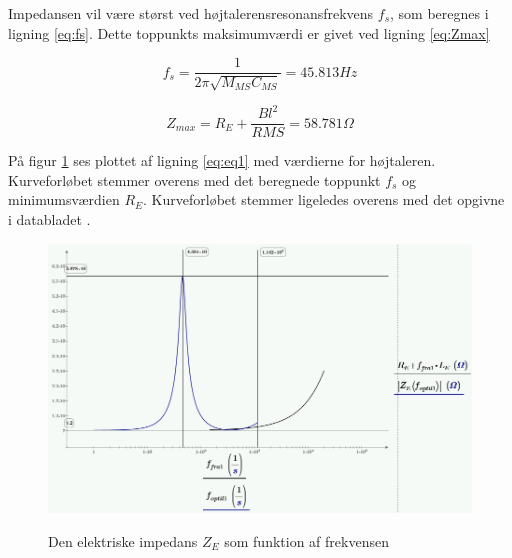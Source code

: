 Impedansen vil være størst ved højtalerensresonansfrekvens $f_s$, som beregnes i ligning \ref{eq:fs}. Dette toppunkts maksimumværdi er givet ved ligning \ref{eq:Zmax} 

\begin{equation}\label{eq:fs}
	f_s=\frac{1}{2 \pi \sqrt{M_{MS} C_{MS}}}=45.813Hz
\end{equation}

\begin{equation}\label{eq:Zmax}
	Z_{max}=R_E+\frac{Bl^2}{R{MS}}=58.781\Omega
\end{equation}

På figur \ref{fig:ZE_graf}  ses plottet af ligning \ref{eq:eq1} med værdierne for højtaleren. Kurveforløbet stemmer overens med det beregnede toppunkt $f_s$ og minimumsværdien $R_E$. Kurveforløbet stemmer ligeledes overens med det opgivne i databladet \citep{FW168}.

\begin{figure}[H]
	\centering
	\includegraphics[width=\textwidth]{Pics/ZE_graf.PNG}
	\label{fig:ZE_graf}
	\caption{Den elektriske impedans $Z_E$ som funktion af frekvensen} 
\end{figure}
